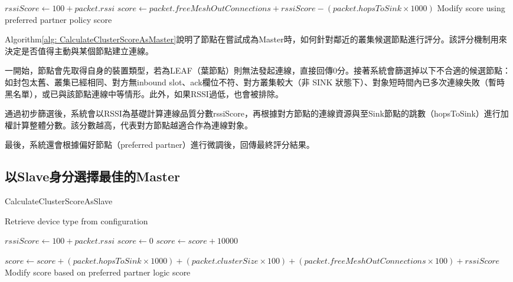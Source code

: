 \begin{ZhChapter}
\begin{algorithm}
\begin{algorithmic}[1]
\State $rssiScore \gets 100 + packet.rssi$
\State $score \gets packet.freeMeshOutConnections + rssiScore - (packet.hopsToSink \times 1000)$
\State Modify score using preferred partner policy
\State \Return score
\end{algorithmic}
\end{algorithm}

Algorithm\ref{alg: CalculateClusterScoreAsMaster}說明了節點在嘗試成為Master時，如何針對鄰近的叢集候選節點進行評分。該評分機制用來決定是否值得主動與某個節點建立連線。

一開始，節點會先取得自身的裝置類型，若為LEAF（葉節點）則無法發起連線，直接回傳0分。接著系統會篩選掉以下不合適的候選節點：如封包太舊、叢集已經相同、對方無inbound slot、ack欄位不符、對方叢集較大（非 SINK 狀態下）、對象短時間內已多次連線失敗（暫時黑名單），或已與該節點連線中等情形。此外，如果RSSI過低，也會被排除。

通過初步篩選後，系統會以RSSI為基礎計算連線品質分數rssiScore，再根據對方節點的連線資源與至Sink節點的跳數（hopsToSink）進行加權計算整體分數。該分數越高，代表對方節點越適合作為連線對象。

最後，系統還會根據偏好節點（preferred partner）進行微調後，回傳最終評分結果。

\subsection{以Slave身分選擇最佳的Master}

\begin{algorithm}
\caption{CalculateClusterScoreAsSlave}
\label{alg: CalculateClusterScoreAsSlave}
\begin{algorithmic}[1]
\State Retrieve device type from configuration
  \EndIf
{}  \EndIf
{}  \EndIf
{}  \EndIf
{}  \EndIf
{}  \EndIf
{}  \EndIf

\State $rssiScore \gets 100 + packet.rssi$
\State $score \gets 0$
    \State $score \gets score + 10000$
\EndIf

\State $score \gets score + (packet.hopsToSink \times 1000) + (packet.clusterSize \times 100) + (packet.freeMeshOutConnections \times 100) + rssiScore$
\State Modify score based on preferred partner logic
\State \Return score
\end{algorithmic}
\end{algorithm}


\end{ZhChapter}
